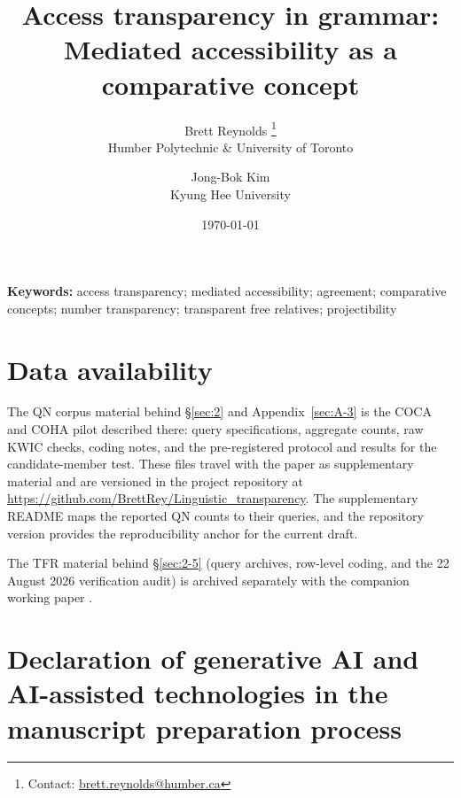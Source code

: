 \documentclass[12pt]{article}
\title{Access transparency in grammar: Mediated accessibility as a comparative concept}
\author{Brett Reynolds \orcidlink{0000-0003-0073-7195}%
\thanks{Contact: \href{mailto:brett.reynolds@humber.ca}{brett.reynolds@humber.ca}}\\
Humber Polytechnic \& University of Toronto
\and
Jong-Bok Kim\\
Kyung Hee University}
\date{\today}
\begin{document}
\maketitle
\linenumbers

\begin{abstract}

\end{abstract}

\noindent\textbf{Keywords:} access transparency; mediated accessibility; agreement; comparative concepts; number transparency; transparent free relatives; projectibility








\clearpage
\appendix
{} %
\begingroup
\scriptsize

\endgroup
\begingroup
\footnotesize


\section*{Data availability}

The QN corpus material behind §\ref{sec:2} and Appendix~\ref{sec:A-3} is the COCA and COHA pilot described there: query specifications, aggregate counts, raw KWIC checks, coding notes, and the pre-registered protocol and results for the  candidate-member test. These files travel with the paper as supplementary material and are versioned in the project repository at \url{https://github.com/BrettRey/Linguistic_transparency}. The supplementary README maps the reported QN counts to their queries, and the repository version provides the reproducibility anchor for the current draft.

The TFR material behind §\ref{sec:2-5} (query archives, row-level coding, and the 22 August 2026 verification audit) is archived separately with the companion working paper \autocite{kim-reynolds-2026-two-kinds-transparency}.

\endgroup
\clearpage
\section*{Declaration of generative AI and AI-assisted technologies in the manuscript preparation process}
\end{document}
